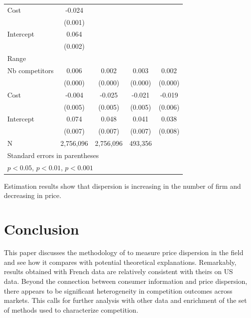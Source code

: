\documentclass[11pt]{article}
\begin{document}
\begin{table}[H]
\begin{tabular}{lcccc }
Cost                     & -0.024\sym{***}  &        \sym{}    &       \sym{}     &\\
{}                       & (0.001)          &                  &                  &\\
Intercept                &  0.064\sym{***}  &        \sym{}    &       \sym{}     &\\
{}                       & (0.002)          &                  &                  &\\
\hline
Range & & & & \\
\hline
Nb competitors           &  0.006\sym{***}  &  0.002\sym{***}  &  0.003\sym{***}  &  0.002\sym{***} \\
{}                       & (0.000)          & (0.000)          & (0.000)          & (0.000)         \\
Cost                     & -0.004\sym{}     & -0.025\sym{***}  & -0.021\sym{***}  & -0.019\sym{***} \\
{}                       & (0.005)          & (0.005)          & (0.005)          & (0.006)         \\
Intercept                &  0.074\sym{***}  & 0.048\sym{***}   &  0.041\sym{***}  &  0.038\sym{***} \\
{}                       & (0.007)          & (0.007)          & (0.007)          & (0.008)         \\
\hline
N                        & 2,756,096        & 2,756,096        & 493,356          &\\
\hline\hline
\multicolumn{4}{l}{\footnotesize Standard errors in parentheses}\\
\multicolumn{4}{l}{\footnotesize \sym{*} \(p<0.05\), \sym{**} \(p<0.01\), \sym{***} \(p<0.001\)}\\
\end{tabular}
\end{table}

Estimation results show that dispersion is increasing in the number of firm and decreasing in price.

\section{Conclusion}

This paper discusses the methodology of \cite{TAP11} to measure price dispersion in the field and see how it compares with potential theoretical explanations. Remarkably, results obtained with French data are relatively consistent with theirs on US data. Beyond the connection between consumer information and price dispersion, there appears to be significant heterogeneity in competition outcomes across markets. This calls for further analysis with other data and enrichment of the set of methods used to characterize competition.
\end{document}
